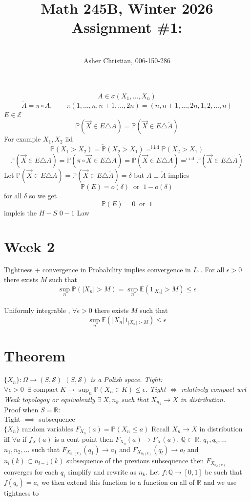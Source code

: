 \documentclass[11pt]{article}
\newcommand{\cnum}{Math 245B}
\newcommand{\ced}{Winter 2026}
\newcommand{\ctitle}[4]{\title{\vspace{-0.5in}\cnum, \ced\\Assignment #1: #2}\author{\vspace{-0.35in}\\#3, #4}}
\begin{document}
\ctitle{\#1}{}{Asher Christian}{006-150-286}
\date{}
\maketitle
\[
A \in \sigma(X_1,\dots,X_n)
\] 
\[
\tilde A = \pi \circ A, \qquad \pi(1,\dots,n,n+1,\dots,2n) = (n,n+1,\dots,2n,1,2,\dots,n)
\] 
$E \in \mathcal{E}$
\[
\mathbb{P}(\vec X \in E \triangle A ) = \mathbb{P}(\vec X \in E \triangle \tilde A)
\] 
For example $X_1,X_2$ iid
\[
    \mathbb{P}(X_1 > X_2) = \tilde {\mathbb{P}}(X_2 > X_1) =^{\text{i.i.d}} \mathbb{P}(X_2 > X_1)
\] 
\[
    \mathbb{P}(\vec X \in E \triangle A) = \tilde{ \mathbb{P}}\left( \pi \circ \vec X \in E \triangle A\right) = \tilde{ \mathbb{P}} (\vec X \in E \triangle \tilde A) =^{\text{i.i.d}} \mathbb{P}(\vec X \in E \triangle \tilde A)
\] 
Let $ \mathbb{P}(\vec X \in E \triangle A) = \mathbb{P}(\vec X \in E \triangle \tilde A) = \delta$ but $A \perp \tilde A$ implies
 \[
     \mathbb{P}(E) = o(\delta) \;\; \text{or} \;\; 1 - o(\delta)
\] 
for all $\delta$ so we get
\[
    \mathbb{P}(E) = 0 \;\; \text{or} \;\; 1
\] 
impleis the $H-S$  $0-1$ Law

\section{Week 2}
Tightness + convergence in Probability implies convergence in $L_1$. For all $\epsilon > 0$ there
exists $M$ such that
 \[
     \sup_{n} \mathbb{P}(|X_n| > M) = \sup_{n} \mathbb{E}(1_{|X_n|} > M) \le \epsilon
\] \\
Uniformly integrable , $\forall \epsilon > 0$ there exists $M$ such that 
 \[
     \sup_{n} \mathbb{E}(|X_n| 1_{|X_n| > M}) \le \epsilon
\] 

\section{Theorem}
\emph{
    $\{X_n\} : \Omega \rightarrow (S, \mathcal{S})$ $(S, \mathcal{S})$ is a Polish space.
    Tight:  $\forall \epsilon > 0 \;\; \exists \; \text{compact} \; K \rightarrow \sup_{n} \mathbb{P}(X_n \in K) \le \epsilon$.
    Tight $\iff$ relatively compact wrt Weak topologoy or equivalently  $\exists \; X, n_k$ such that  $X_{n_k} \rightarrow X $ in distribution.
}\\
Proof when $ S = \mathbb{R}$: \\
Tight $\implies$ subsequence\\
$\{X_n\}$ random variables 
$F_{X_n}(a) = \mathbb{P}(X_n \le a)$
Recall $X_n \rightarrow X$ in distribution iff $\forall a$ if  $f_X(a)$ is a cont point then  $F_{X_n}(a) \rightarrow F_X(a)$.
$ \mathbb{Q} \subset \mathbb{R}$. $q_1,q_2,\dots$ $n_1,n_2,\dots$ such that
$F_{X_{n_1(k)}}(q_1) \rightarrow a_1$ and $F_{X_{n_l(k)}}(q_l) \rightarrow a_l$ and $n_l(k) \subset n_{l-1}(k)$ subsequence of the previous subsequence
then $F_{X_{n_k(k)}}$ converges for each $q_i$ simplify and rewrite as  $n_k$. Let  $f : \mathbb{Q} \rightarrow [0,1]$ be such that $f(q_i) = a_i$ we then extend this function to a function on all of $ \mathbb{R}$ and we use tightness
to
\end{document}
